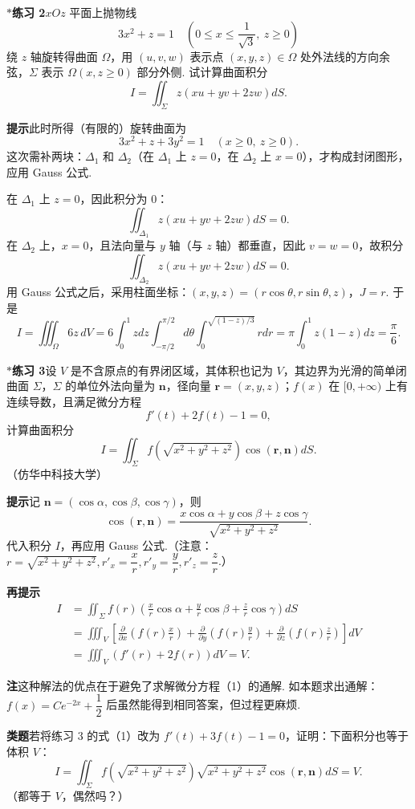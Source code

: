 \documentclass[UTF8,12pt,a4paper,fontset=fandol]{ctexart}
\begin{document}
\noindent\textbf{$*$练习 2}\quad $xOz$ 平面上抛物线
\[
3x^2+z=1\quad\left(0\le x\le\frac1{\sqrt3},\ z\ge0\right)
\]
绕 $z$ 轴旋转得曲面 $\Omega$，用 $(u,v,w)$ 表示点 $(x,y,z)\in\Omega$ 处外法线的方向余弦，$\Sigma$ 表示 $\Omega(x,z\ge0)$ 部分外侧. 试计算曲面积分
\[
I=\iint_\Sigma z(xu+yv+2zw)dS.
\]

\noindent\textbf{提示}\quad 此时所得（有限的）旋转曲面为
\[
3x^2+z+3y^2=1\quad(x\ge0,\ z\ge0).
\]
这次需补两块：$\Delta_1$ 和 $\Delta_2$（在 $\Delta_1$ 上 $z=0$，在 $\Delta_2$ 上 $x=0$），才构成封闭图形，应用 Gauss 公式.

在 $\Delta_1$ 上 $z=0$，因此积分为 $0$：
\[
\iint_{\Delta_1}z(xu+yv+2zw)dS=0.
\]
在 $\Delta_2$ 上，$x=0$，且法向量与 $y$ 轴（与 $z$ 轴）都垂直，因此 $v=w=0$，故积分
\[
\iint_{\Delta_2}z(xu+yv+2zw)dS=0.
\]
用 Gauss 公式之后，采用柱面坐标：$(x,y,z)=(r\cos\theta,r\sin\theta,z)$，$J=r$. 于是
\[
I=\iiint_\Omega6z\,dV
=6\int_0^1zdz\int_{-\pi/2}^{\pi/2}d\theta
\int_0^{\sqrt{(1-z)/3}}rdr
=\pi\int_0^1z(1-z)dz=\frac\pi6.
\]

\noindent\textbf{$*$练习 3}\quad 设 $V$ 是不含原点的有界闭区域，其体积也记为 $V$，其边界为光滑的简单闭曲面 $\Sigma$，$\Sigma$ 的单位外法向量为 $\mathbf n$，径向量 $\mathbf r=(x,y,z)$；$f(x)$ 在 $[0,+\infty)$ 上有连续导数，且满足微分方程
\[
f'(t)+2f(t)-1=0, \tag{1}
\]
计算曲面积分
\[
I=\iint_\Sigma f\left(\sqrt{x^2+y^2+z^2}\right)\cos(\mathbf r,\mathbf n)dS.
\]
（仿华中科技大学）

\noindent\textbf{提示}\quad 记 $\mathbf n=(\cos\alpha,\cos\beta,\cos\gamma)$，则
\[
\cos(\mathbf r,\mathbf n)=
\frac{x\cos\alpha+y\cos\beta+z\cos\gamma}{\sqrt{x^2+y^2+z^2}}.
\]
代入积分 $I$，再应用 Gauss 公式.（注意：$r=\sqrt{x^2+y^2+z^2},r'_x=\dfrac xr,r'_y=\dfrac yr,r'_z=\dfrac zr$.）

\noindent\textbf{再提示}\quad
\[
\begin{aligned}
I&=\iint_\Sigma f(r)\left(\frac xr\cos\alpha+\frac yr\cos\beta+\frac zr\cos\gamma\right)dS\\
&=\iiint_V\left[
\frac{\partial}{\partial x}\left(f(r)\frac xr\right)
+\frac{\partial}{\partial y}\left(f(r)\frac yr\right)
+\frac{\partial}{\partial z}\left(f(r)\frac zr\right)\right]dV\\
&=\iiint_V(f'(r)+2f(r))dV=V.
\end{aligned}
\]

\noindent\textbf{注}\quad 这种解法的优点在于避免了求解微分方程（1）的通解. 如本题求出通解：$f(x)=Ce^{-2x}+\dfrac12$ 后虽然能得到相同答案，但过程更麻烦.

\noindent\textbf{类题}\quad 若将练习 3 的式（1）改为 $f'(t)+3f(t)-1=0$，证明：下面积分也等于体积 $V$：
\[
I=\iint_\Sigma f\left(\sqrt{x^2+y^2+z^2}\right)
\sqrt{x^2+y^2+z^2}\cos(\mathbf r,\mathbf n)dS=V.
\]
（都等于 $V$，偶然吗？）
\end{document}
